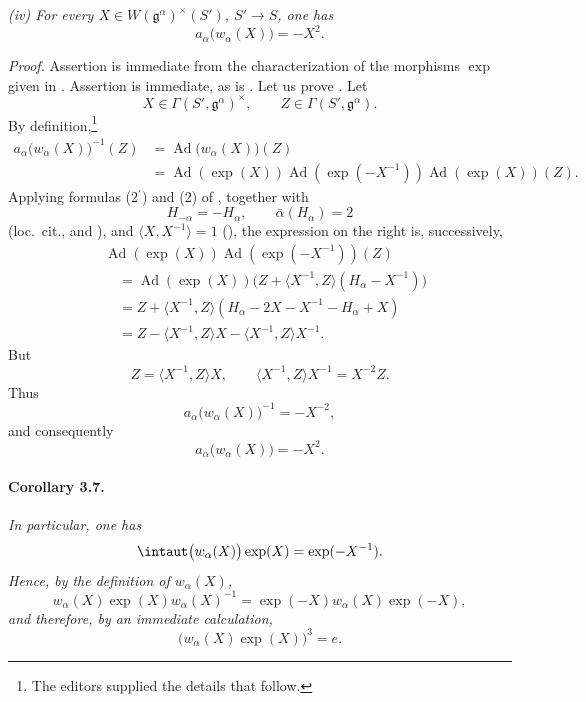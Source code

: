 \smallskip
\noindent\emph{\textup{(iv)} For every
\(X\in W(\mathfrak g^\alpha)^\times(S')\), \(S'\to S\), one has}
\[
  a_\alpha\bigl(w_\alpha(X)\bigr)=-X^2.
\]

\smallskip
\noindent\emph{Proof.}
Assertion \textup{} is immediate from the characterization of the
morphisms \(\exp\) given in .  Assertion \textup{} is
immediate, as is \textup{}.  Let us prove \textup{}.  Let
\[
  X\in\Gamma(S',\mathfrak g^\alpha)^\times,
  \qquad
  Z\in\Gamma(S',\mathfrak g^\alpha).
\]
By definition,\footnote{The editors supplied the details that follow.}
\[
\begin{aligned}
  a_\alpha\bigl(w_\alpha(X)\bigr)^{-1}(Z)
    &={}\operatorname{Ad}\bigl(w_\alpha(X)\bigr)(Z)\\
    &={}\operatorname{Ad}(\exp(X))
       \operatorname{Ad}(\exp(-X^{-1}))
       \operatorname{Ad}(\exp(X))(Z).
\end{aligned}
\]
Applying formulas \textup{(2\(^{\prime}\))} and \textup{(2)} of
, together with
\[
  H_{-\alpha}=-H_\alpha,
  \qquad
  \bar\alpha(H_\alpha)=2
\]
\textup{(loc.\ cit., \textup{} and \textup{})}, and
\(\langle X,X^{-1}\rangle=1\) \textup{()}, the expression on the
right is, successively,
\[
\begin{aligned}
  &\operatorname{Ad}(\exp(X))
    \operatorname{Ad}(\exp(-X^{-1}))(Z)\\
  &\quad={}\operatorname{Ad}(\exp(X))
       \bigl(Z+\langle X^{-1},Z\rangle(H_\alpha-X^{-1})\bigr)\\
  &\quad={}Z+\langle X^{-1},Z\rangle
       (H_\alpha-2X-X^{-1}-H_\alpha+X)\\
  &\quad={}Z-\langle X^{-1},Z\rangle X
       -\langle X^{-1},Z\rangle X^{-1}.
\end{aligned}
\]
But
\[
  Z=\langle X^{-1},Z\rangle X,
  \qquad
  \langle X^{-1},Z\rangle X^{-1}=X^{-2}Z.
\]
Thus
\[
  a_\alpha\bigl(w_\alpha(X)\bigr)^{-1}=-X^{-2},
\]
and consequently
\[
  a_\alpha\bigl(w_\alpha(X)\bigr)=-X^2.
\]

\paragraph{\textbf{Corollary 3.7.}}
\emph{In particular, one has}
\[
  \intaut\bigl(w_\alpha(X)\bigr)\exp(X)=\exp(-X^{-1}).
\]
\emph{Hence, by the definition of \(w_\alpha(X)\),}
\[
  w_\alpha(X)\exp(X)w_\alpha(X)^{-1}
    =\exp(-X)w_\alpha(X)\exp(-X),
\]
\emph{and therefore, by an immediate calculation,}
\[
  \bigl(w_\alpha(X)\exp(X)\bigr)^3=e.
\]


